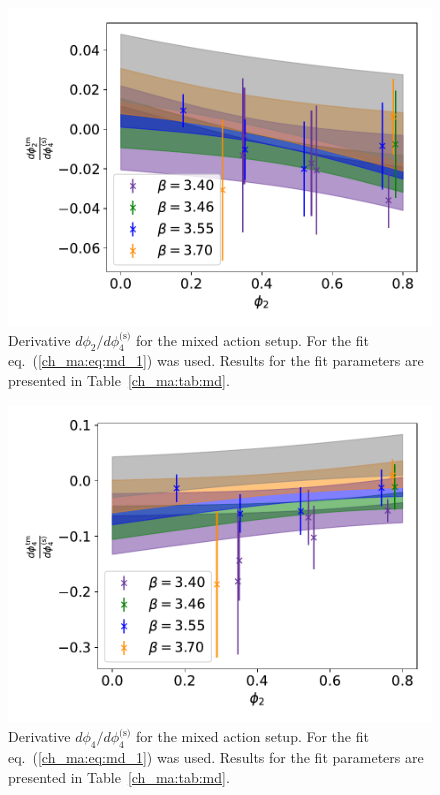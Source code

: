 \begin{figure}
    \centering
    \includegraphics[width=1.\textwidth]{./cap4/figs/dphi2_tm.pdf}
    \caption{Derivative $d\phi_2/d\phi_4^{\textrm{(s)}}$ for the mixed action setup. For the fit eq.~(\ref{ch_ma:eq:md_1}) was used. Results for the fit parameters are presented in Table~\ref{ch_ma:tab:md}.}
    \label{ch_ma:fig:dphi2_tm}
\end{figure}

\begin{figure}
    \centering
    \includegraphics[width=1.\textwidth]{./cap4/figs/dphi4_tm.pdf}
    \caption{Derivative $d\phi_4/d\phi_4^{\textrm{(s)}}$ for the mixed action setup. For the fit eq.~(\ref{ch_ma:eq:md_1}) was used. Results for the fit parameters are presented in Table~\ref{ch_ma:tab:md}.}
    \label{ch_ma:fig:dphi4_tm}
\end{figure}


